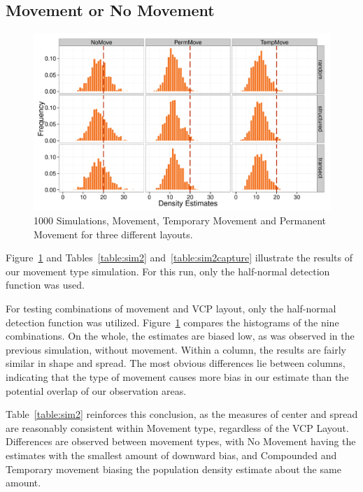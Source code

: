\documentclass[12pt]{article}
\begin{document}
\subsection{Movement or No Movement}
\begin{figure}

	\includegraphics[width=\textwidth]{../images/MovementSim2.pdf}
	\caption{1000 Simulations, Movement, Temporary Movement and Permanent Movement for three different layouts. \label{fig:sim2}}
		
\end{figure}


Figure~\ref{fig:sim2} and Tables~\ref{table:sim2} and~\ref{table:sim2capture} illustrate the results of our movement type simulation. For this run, only the half-normal detection function was used. 

For testing combinations of movement and VCP layout, only the half-normal detection function was utilized. Figure~\ref{fig:sim2} compares the histograms of the nine combinations. On the whole, the estimates are biased low, as was observed in the previous simulation, without movement. Within a column, the results are fairly similar in shape and spread. The most obvious differences lie between columns, indicating that the type of movement causes more bias in our estimate than the potential overlap of our observation areas. 

Table~\ref{table:sim2} reinforces this conclusion, as the measures of center and spread are reasonably consistent within Movement type, regardless of the VCP Layout. Differences are observed between movement types, with No Movement having the estimates with the smallest amount of downward bias, and Compounded and Temporary movement biasing the population density estimate about the same amount.
\end{document}
